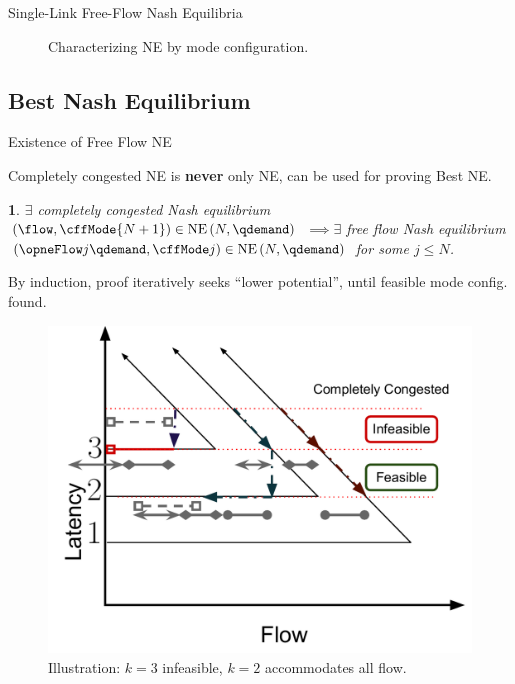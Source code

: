 \documentclass[english, smaller]{beamer}
\theoremstyle{plain}
\theoremstyle{definition}
\theoremstyle{plain}
\newtheorem{lem}[thm]{\protect\lemmaname}
\theoremstyle{plain}
\providecommand{\lemmaname}{Lemma}
\begin{document}
\begin{frame}{Single-Link Free-Flow Nash Equilibria}
\begin{figure}
{}

\caption{Characterizing NE by mode configuration.}
\end{figure}



\end{frame}

\subsection{Best Nash Equilibrium}


\begin{frame}{Existence of Free Flow NE}

Completely congested NE is \textbf{never} only NE, can be used for
proving Best NE.
\begin{lem}
$\exists$ completely congested Nash equilibrium $\left(\flow,\cffMode{\NLinks+1}\right)\in\NashEquilibrium{\NLinks}{\qdemand}$ $\implies\exists$
free flow Nash equilibrium \textrm{\textup{$\left(\opneFlow j{\qdemand},\cffMode j\right)\in\NashEquilibrium{\NLinks}{\qdemand}$
for some $j\leq N$.}}
\end{lem}
By induction, proof iteratively seeks ``lower potential'', until
feasible mode config. found.

\begin{figure}
\begin{centering}
\includegraphics[scale=0.25]{../../figures/presentation/LemmaExistenceofSingleLinkFreeFlowNE}
\par\end{centering}

\caption{Illustration: $k=3$ infeasible, $k=2$ accommodates all flow.}
\end{figure}



\end{frame}
\end{document}
